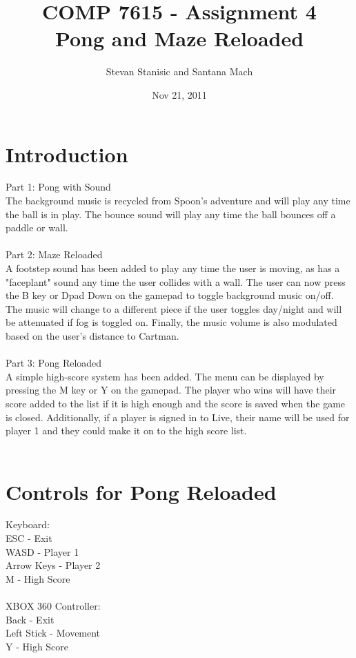 \documentclass[titlepage]{article}
\begin{document}
\author{Stevan Stanisic and Santana Mach}
\title{COMP 7615 - Assignment 4 \\ Pong and Maze Reloaded}
\date{Nov 21, 2011}
\maketitle{}

\pagebreak

\section{Introduction}

Part 1: Pong with Sound \\
The background music is recycled from Spoon's adventure and will play any time the ball is in play. The bounce sound will play any time the ball bounces off a paddle or wall. \\
\\
Part 2: Maze Reloaded \\
A footstep sound has been added to play any time the user is moving, as has a "faceplant" sound any time the user collides with a wall. The user can now press the B key or Dpad Down
on the gamepad to toggle background music on/off. The music will change to a different piece if the user toggles day/night and will be attenuated if fog is toggled on. Finally, the music volume
is also modulated based on the user's distance to Cartman. \\
\\
Part 3: Pong Reloaded \\
A simple high-score system has been added. The menu can be displayed by pressing the M key or Y on the gamepad. The player who wins will have their score added to the list if it is high enough and the score is saved when the game is closed.  Additionally, if a player is signed in to Live, their name will be used for player 1 and they could make it on to the high score list. \\
\\

\section{Controls for Pong Reloaded}
Keyboard: \\
ESC - Exit \\
WASD - Player 1 \\
Arrow Keys - Player 2 \\
M - High Score \\
\\
XBOX 360 Controller: \\
Back - Exit \\
Left Stick - Movement \\
Y - High Score \\
\end{document}
